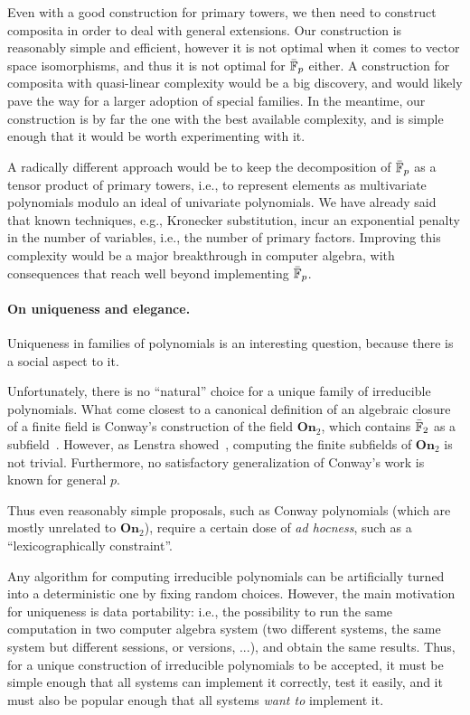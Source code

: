 \documentclass[b5layout]{hdr}
\begin{document}
Even with a good construction for primary towers, we then need to
construct composita in order to deal with general extensions. %
Our construction is reasonably simple and efficient, however it is not
optimal when it comes to vector space isomorphisms, and thus it is not
optimal for $\bar{\mathbb{F}}_p$ either. %
A construction for composita with quasi-linear complexity would be a
big discovery, and would likely pave the way for a larger adoption of
special families. %
In the meantime, our construction is by far the one with the best
available complexity, and is simple enough that it would be worth
experimenting with it. %

A radically different approach would be to keep the decomposition of
$\bar{\mathbb{F}}_p$ as a tensor product of primary towers, i.e., to represent
elements as multivariate polynomials modulo an ideal of univariate
polynomials. %
We have already said that known techniques, e.g., Kronecker
substitution, incur an exponential penalty in the number of variables,
i.e., the number of primary factors. %
Improving this complexity would be a major breakthrough in computer
algebra, with consequences that reach well beyond implementing
$\bar{\mathbb{F}}_p$.

\paragraph{On uniqueness and elegance.}
Uniqueness in families of polynomials is an interesting question,
because there is a social aspect to it. %

Unfortunately, there is no ``natural'' choice for a unique family of
irreducible polynomials. %
What come closest to a canonical definition of an algebraic closure of
a finite field is Conway's construction of the field $\mathbf{On}_2$,
which contains $\bar{\mathbb{F}}_2$ as a subfield~\cite{Conway:ONAG2000}. %
However, as Lenstra showed~\cite{LENSTRA1977389}, computing the finite
subfields of $\mathbf{On}_2$ is not trivial. %
Furthermore, no satisfactory generalization of Conway's work is known
for general $p$. %

Thus even reasonably simple proposals, such as Conway polynomials
(which are mostly unrelated to $\mathbf{On}_2$), require a certain
dose of \emph{ad hocness}, such as a ``lexicographically
constraint''. %

Any algorithm for computing irreducible polynomials can be
artificially turned into a deterministic one by fixing random
choices. %
However, the main motivation for uniqueness is data portability: i.e.,
the possibility to run the same computation in two computer algebra
system (two different systems, the same system but different sessions,
or versions, ...), and obtain the same results. %
Thus, for a unique construction of irreducible polynomials to be
accepted, it must be simple enough that all systems can implement it
correctly, test it easily, and it must also be popular enough that
all systems \emph{want to} implement it. %
\end{document}
